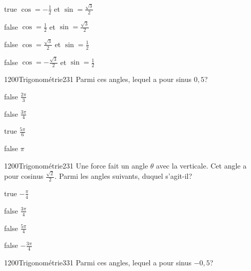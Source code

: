 \documentclass[11pt]{article}
\begin{document}
            \begin{reponses}
                \item[true] $\cos = -\frac{1}{2}$ et $\sin = \frac{\sqrt{3}}{2}$
                \item[false] $\cos = \frac{1}{2}$ et $\sin = \frac{\sqrt{3}}{2}$
                \item[false] $\cos = \frac{\sqrt{3}}{2}$ et $\sin = \frac{1}{2}$
                \item[false] $\cos = -\frac{\sqrt{3}}{2}$ et $\sin = \frac{1}{2}$
            \end{reponses}
        
        	\begin{question}{1200}{Trigonométrie}{2}{31}
				Parmi ces angles, lequel a pour sinus $0,5$?
            \end{question}

            \begin{reponses}
            	\item[false] $\frac{2\pi}{3}$
            	\item[false] $\frac{3\pi}{4}$
                \item[true] $\frac{5\pi}{6}$
                \item[false] $\pi$
            \end{reponses}
        
        	\begin{question}{1200}{Trigonométrie}{2}{31}
				Une force fait un angle $\theta$ avec la verticale. Cet angle a pour cosinus $\frac{\sqrt{2}}{2}$. Parmi les angles suivants, duquel s'agit-il?
            \end{question}

            \begin{reponses}
            	\item[true] $-\frac{\pi}{4}$
            	\item[false] $\frac{3\pi}{4}$
                \item[false] $\frac{5\pi}{4}$
                \item[false] $-\frac{3\pi}{4}$
            \end{reponses}
    
            \begin{question}{1200}{Trigonométrie}{3}{31}
                Parmi ces angles, lequel a pour sinus $-0,5$?
            \end{question}
\end{document}
